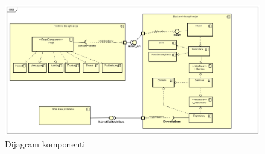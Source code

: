 			 \begin{figure}[H]
			 	\includegraphics[width=\textwidth]{dijagrami/Dijagram komponenti.PNG} %
			 	\caption{Dijagram komponenti}
			 	\label{fig:dijagramkomponenti} %
			 \end{figure}